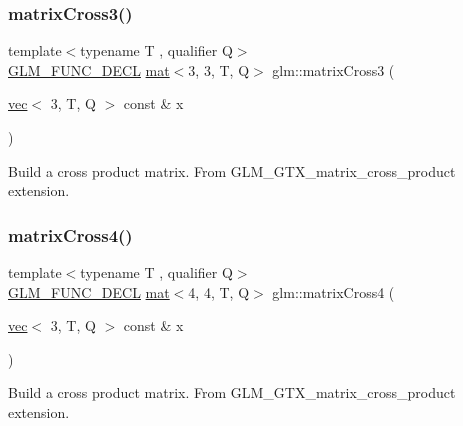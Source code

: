 \subsubsection{\texorpdfstring{matrix\+Cross3()}{matrixCross3()}}
{\footnotesize\ttfamily template$<$typename T , qualifier Q$>$ \\
\mbox{\hyperlink{setup_8hpp_ab2d052de21a70539923e9bcbf6e83a51}{G\+L\+M\+\_\+\+F\+U\+N\+C\+\_\+\+D\+E\+CL}} \mbox{\hyperlink{structglm_1_1mat}{mat}}$<$3, 3, T, Q$>$ glm\+::matrix\+Cross3 (\begin{DoxyParamCaption}\item[{\mbox{\hyperlink{structglm_1_1vec}{vec}}$<$ 3, T, Q $>$ const \&}]{x }\end{DoxyParamCaption})}

Build a cross product matrix. From G\+L\+M\+\_\+\+G\+T\+X\+\_\+matrix\+\_\+cross\+\_\+product extension. \mbox{\label{group__gtx__matrix__cross__product_ga20057fff91ddafa102934adb25458cde}} 
\subsubsection{\texorpdfstring{matrix\+Cross4()}{matrixCross4()}}
{\footnotesize\ttfamily template$<$typename T , qualifier Q$>$ \\
\mbox{\hyperlink{setup_8hpp_ab2d052de21a70539923e9bcbf6e83a51}{G\+L\+M\+\_\+\+F\+U\+N\+C\+\_\+\+D\+E\+CL}} \mbox{\hyperlink{structglm_1_1mat}{mat}}$<$4, 4, T, Q$>$ glm\+::matrix\+Cross4 (\begin{DoxyParamCaption}\item[{\mbox{\hyperlink{structglm_1_1vec}{vec}}$<$ 3, T, Q $>$ const \&}]{x }\end{DoxyParamCaption})}

Build a cross product matrix. From G\+L\+M\+\_\+\+G\+T\+X\+\_\+matrix\+\_\+cross\+\_\+product extension. 